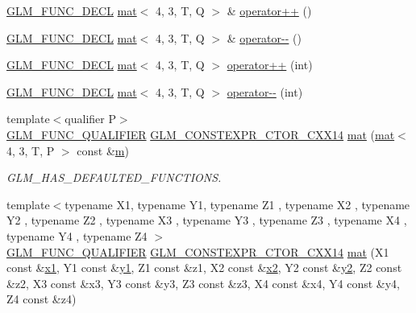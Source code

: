 \begin{DoxyCompactItemize}
\item 
\hyperlink{setup_8hpp_ab2d052de21a70539923e9bcbf6e83a51}{G\+L\+M\+\_\+\+F\+U\+N\+C\+\_\+\+D\+E\+CL} \hyperlink{structglm_1_1mat}{mat}$<$ 4, 3, T, Q $>$ \& \hyperlink{structglm_1_1mat_3_014_00_013_00_01_t_00_01_q_01_4_ab869177fe302f1cef14bbca99a103eb1}{operator++} ()
\item 
\hyperlink{setup_8hpp_ab2d052de21a70539923e9bcbf6e83a51}{G\+L\+M\+\_\+\+F\+U\+N\+C\+\_\+\+D\+E\+CL} \hyperlink{structglm_1_1mat}{mat}$<$ 4, 3, T, Q $>$ \& \hyperlink{structglm_1_1mat_3_014_00_013_00_01_t_00_01_q_01_4_aaa6df2edca16cfac23a2806f2fd8ae61}{operator-\/-\/} ()
\item 
\hyperlink{setup_8hpp_ab2d052de21a70539923e9bcbf6e83a51}{G\+L\+M\+\_\+\+F\+U\+N\+C\+\_\+\+D\+E\+CL} \hyperlink{structglm_1_1mat}{mat}$<$ 4, 3, T, Q $>$ \hyperlink{structglm_1_1mat_3_014_00_013_00_01_t_00_01_q_01_4_afe2cd1deac96a5b687a5978e44652428}{operator++} (int)
\item 
\hyperlink{setup_8hpp_ab2d052de21a70539923e9bcbf6e83a51}{G\+L\+M\+\_\+\+F\+U\+N\+C\+\_\+\+D\+E\+CL} \hyperlink{structglm_1_1mat}{mat}$<$ 4, 3, T, Q $>$ \hyperlink{structglm_1_1mat_3_014_00_013_00_01_t_00_01_q_01_4_a1071ca01aa47be09af44bbff97d99639}{operator-\/-\/} (int)
\item 
{\footnotesize template$<$qualifier P$>$ }\\\hyperlink{setup_8hpp_a33fdea6f91c5f834105f7415e2a64407}{G\+L\+M\+\_\+\+F\+U\+N\+C\+\_\+\+Q\+U\+A\+L\+I\+F\+I\+ER} \hyperlink{setup_8hpp_a0900f9145e68bf6061b6f5e7be3fa751}{G\+L\+M\+\_\+\+C\+O\+N\+S\+T\+E\+X\+P\+R\+\_\+\+C\+T\+O\+R\+\_\+\+C\+X\+X14} \hyperlink{structglm_1_1mat_3_014_00_013_00_01_t_00_01_q_01_4_a313800de73dd26da692bec90ff24ad42}{mat} (\hyperlink{structglm_1_1mat}{mat}$<$ 4, 3, T, P $>$ const \&\hyperlink{_s_d_l__opengl__glext_8h_af593500c283bf1a787a6f947f503a5c2}{m})
\begin{DoxyCompactList}\small\item\em G\+L\+M\+\_\+\+H\+A\+S\+\_\+\+D\+E\+F\+A\+U\+L\+T\+E\+D\+\_\+\+F\+U\+N\+C\+T\+I\+O\+NS. \end{DoxyCompactList}\item 
{\footnotesize template$<$typename X1, typename Y1, typename Z1 , typename X2 , typename Y2 , typename Z2 , typename X3 , typename Y3 , typename Z3 , typename X4 , typename Y4 , typename Z4 $>$ }\\\hyperlink{setup_8hpp_a33fdea6f91c5f834105f7415e2a64407}{G\+L\+M\+\_\+\+F\+U\+N\+C\+\_\+\+Q\+U\+A\+L\+I\+F\+I\+ER} \hyperlink{setup_8hpp_a0900f9145e68bf6061b6f5e7be3fa751}{G\+L\+M\+\_\+\+C\+O\+N\+S\+T\+E\+X\+P\+R\+\_\+\+C\+T\+O\+R\+\_\+\+C\+X\+X14} \hyperlink{structglm_1_1mat_3_014_00_013_00_01_t_00_01_q_01_4_a97ef5af99c1162296ecfe810c2d8a4b1}{mat} (X1 const \&\hyperlink{_s_d_l__opengl__glext_8h_a49825216c96caaeb09237b36651181c5}{x1}, Y1 const \&\hyperlink{_s_d_l__opengl__glext_8h_a3af6c78fcdfccea028a5878bc747ef39}{y1}, Z1 const \&z1, X2 const \&\hyperlink{_s_d_l__opengl__glext_8h_a7b907a03236685c534d89d604cff23c8}{x2}, Y2 const \&\hyperlink{_s_d_l__opengl__glext_8h_a2be1135ed68e8d80fa9e130c7814f8c2}{y2}, Z2 const \&z2, X3 const \&x3, Y3 const \&y3, Z3 const \&z3, X4 const \&x4, Y4 const \&y4, Z4 const \&z4)

\end{DoxyCompactItemize}
